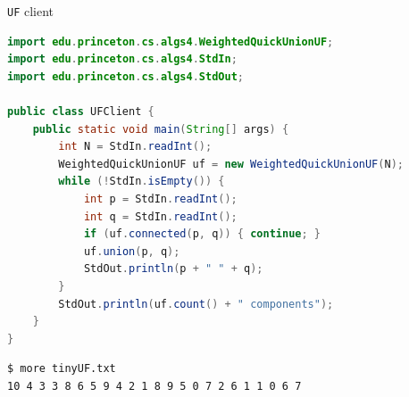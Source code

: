 \documentclass[8pt,a4paper,compress]{beamer}
\begin{document}
\begin{frame}[fragile]
\begin{minipage}{250pt}

\pause
\smallskip

\lstinline{UF} client
\begin{lstlisting}[language=Java]
import edu.princeton.cs.algs4.WeightedQuickUnionUF;
import edu.princeton.cs.algs4.StdIn;
import edu.princeton.cs.algs4.StdOut;

public class UFClient {
    public static void main(String[] args) {
        int N = StdIn.readInt();
        WeightedQuickUnionUF uf = new WeightedQuickUnionUF(N);
        while (!StdIn.isEmpty()) {
            int p = StdIn.readInt();
            int q = StdIn.readInt();
            if (uf.connected(p, q)) { continue; }
            uf.union(p, q);
            StdOut.println(p + " " + q);
        }
        StdOut.println(uf.count() + " components");
    }
}
\end{lstlisting}
    
\pause

\begin{lstlisting}[language={}]
$ more tinyUF.txt
10 4 3 3 8 6 5 9 4 2 1 8 9 5 0 7 2 6 1 1 0 6 7
\end{lstlisting}    

\pause


\end{minipage}
\end{frame}
\end{document}
